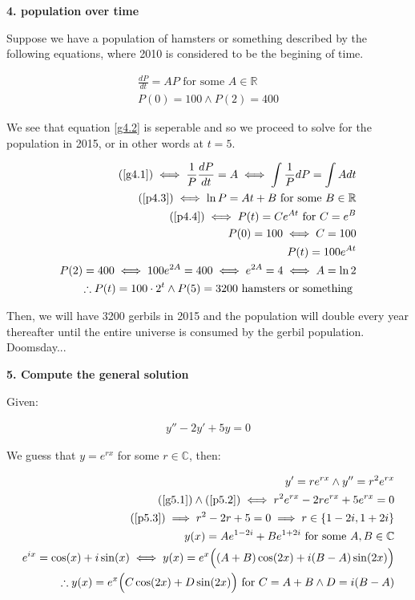\documentclass{article}
\newcommand{\reals}{\mathbb{R}}
\newcommand{\cplx}{\mathbb{C}}
\begin{document}
\medskip

\textbf{4. population over time}

Suppose we have a population of hamsters or something described by the following equations,
where 2010 is considered to be the begining of time.

\begin{align}
	\label{g4.1}
	\frac{dP}{dt} = AP \textrm{ for some } A \in \reals \\
	\label{g4.2}
	P(0) = 100 \land P(2) = 400
\end{align}

We see that equation \ref{g4.2} is seperable
and so we proceed to solve for the population in 2015,
or in other words at $t = 5$.

\begin{align}
	\label{p4.3}
	(\ref{g4.1}) \iff \frac{1}{P} \frac{dP}{dt} = A \iff \int \frac{1}{P} dP = \int A dt \\
	\label{p4.4}
	(\ref{p4.3}) \iff \ln P = At + B \textrm{ for some } B \in \reals \\
	(\ref{p4.4}) \iff P(t) = Ce^{At} \textrm{ for } C = e^B \\
	P(0) = 100 \iff C = 100 \\
	P(t) = 100e^{At} \\
	P(2) = 400 \iff 100e^{2A} = 400 \iff e^{2A} = 4 \iff A = \ln 2 \\
	\therefore P(t) = 100 \cdot 2^t \land P(5) = 3200 \textrm{ hamsters or something }
\end{align}

Then, we will have 3200 gerbils in 2015 and the population will double every year thereafter
until the entire universe is consumed by the gerbil population. Doomsday...

\medskip

\textbf{5. Compute the general solution}

Given:

\begin{align}
	\label{g5.1}
	y'' - 2y' + 5y = 0
\end{align}

We guess that $y = e^{rx}$ for some $r \in \cplx$, then:

\begin{align}
	\label{p5.2}
	y' = re^{rx} \land y'' = r^2e^{rx} \\
	\label{p5.3}
	(\ref{g5.1}) \land (\ref{p5.2}) \iff r^2e^{rx} - 2re^{rx} + 5e^{rx} = 0 \\
	\label{p5.4}
	(\ref{p5.3}) \implies r^2 - 2r + 5 = 0 \implies r \in \{ 1-2i, 1+2i \} \\
	y(x) = Ae^{1-2i} + Be^{1+2i} \textrm{ for some } A,B \in \cplx \\
	e^{ix} = \cos(x) + i \sin(x) \iff y(x) = e^x\Big((A+B)\cos(2x) + i(B-A)\sin(2x)\Big) \\
	\therefore y(x) = e^x\Big(C\cos(2x) + D\sin(2x)\Big) \textrm{ for } C = A + B \land D = i(B-A)
\end{align}
\end{document}
